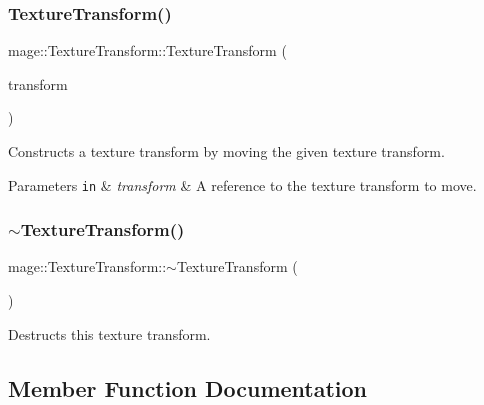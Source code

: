 \subsubsection{\texorpdfstring{Texture\+Transform()}{TextureTransform()}\hspace{0.1cm}{\footnotesize\ttfamily [4/4]}}
{\footnotesize\ttfamily mage\+::\+Texture\+Transform\+::\+Texture\+Transform (\begin{DoxyParamCaption}\item[{\hyperlink{structmage_1_1_texture_transform}{Texture\+Transform} \&\&}]{transform }\end{DoxyParamCaption})\hspace{0.3cm}{\ttfamily [default]}}

Constructs a texture transform by moving the given texture transform.


\begin{DoxyParams}[1]{Parameters}
\mbox{\tt in}  & {\em transform} & A reference to the texture transform to move. \\
\hline
\end{DoxyParams}
\hypertarget{structmage_1_1_texture_transform_afb608ccc7bc107b893ea68937529a901}{}\label{structmage_1_1_texture_transform_afb608ccc7bc107b893ea68937529a901} 
\subsubsection{\texorpdfstring{$\sim$\+Texture\+Transform()}{~TextureTransform()}}
{\footnotesize\ttfamily mage\+::\+Texture\+Transform\+::$\sim$\+Texture\+Transform (\begin{DoxyParamCaption}{ }\end{DoxyParamCaption})\hspace{0.3cm}{\ttfamily [default]}}

Destructs this texture transform. 

\subsection{Member Function Documentation}
\hypertarget{structmage_1_1_texture_transform_adf86494ee53ee0b20db30c392b9aeb01}{}\label{structmage_1_1_texture_transform_adf86494ee53ee0b20db30c392b9aeb01} 
